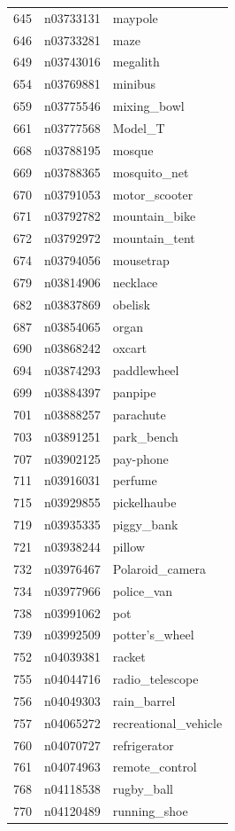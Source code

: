 \begin{table}
\begin{tabular}{cll}
645 & n03733131 & maypole \\
646 & n03733281 & maze \\
649 & n03743016 & megalith \\
654 & n03769881 & minibus \\
659 & n03775546 & mixing_bowl \\
661 & n03777568 & Model_T \\
668 & n03788195 & mosque \\
669 & n03788365 & mosquito_net \\
670 & n03791053 & motor_scooter \\
671 & n03792782 & mountain_bike \\
672 & n03792972 & mountain_tent \\
674 & n03794056 & mousetrap \\
679 & n03814906 & necklace \\
682 & n03837869 & obelisk \\
687 & n03854065 & organ \\
690 & n03868242 & oxcart \\
694 & n03874293 & paddlewheel \\
699 & n03884397 & panpipe \\
701 & n03888257 & parachute \\
703 & n03891251 & park_bench \\
707 & n03902125 & pay-phone \\
711 & n03916031 & perfume \\
715 & n03929855 & pickelhaube \\
719 & n03935335 & piggy_bank \\
721 & n03938244 & pillow \\
732 & n03976467 & Polaroid_camera \\
734 & n03977966 & police_van \\
738 & n03991062 & pot \\
739 & n03992509 & potter's_wheel \\
752 & n04039381 & racket \\
755 & n04044716 & radio_telescope \\
756 & n04049303 & rain_barrel \\
757 & n04065272 & recreational_vehicle \\
760 & n04070727 & refrigerator \\
761 & n04074963 & remote_control \\
768 & n04118538 & rugby_ball \\
770 & n04120489 & running_shoe \\

\end{tabular}
\end{table}
